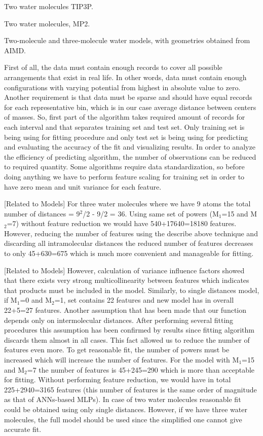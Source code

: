 \documentclass[aip,jcp,reprint,amsmath,amssymb,nature]{revtex4-1}
\begin{document}

Two water molecules TIP3P.

Two water molecules, MP2.

Two-molecule and three-molecule water models, with geometries obtained 
from AIMD.

First of all, the data must contain enough records to cover all possible arrangements that exist in real life. 
In other words, data must contain enough configurations with varying potential from highest in absolute value to zero. 
Another requirement is that data must be sparse and should have equal records for each representative bin, which is in our 
case average distance between centers of masses. 
So, first part of the algorithm takes required amount of records for each interval and that separates training set and test set. 
Only training set is being using for fitting procedure and only test set is being using for predicting and evaluating the accuracy of the fit and visualizing results. 
In order to analyze the efficiency of predicting algorithm, the number of observations can be reduced to required quantity. 
Some algorithms require data standardization, so before doing anything we have to perform feature scaling for training set in order to have zero mean and unit variance for each feature.

[Related to Models] For three water molecules where we have 9 atoms the total number of distances = 9$^{2}$/2 - 9/2 = 36. Using same set of powers (M$_{1}$=15 and M$_{2}$=7) without feature reduction we would have 540+17640=18180 features. However, reducing the number of features using the describe above technique and discarding all intramolecular distances the reduced number of features decreases to only 45+630=675 which is much more convenient and manageable for fitting.

[Related to Models] However, calculation of variance influence factors showed that there 
exists very strong multicollinearity between features which indicates 
that products must be included in the model. Similarly, to single 
distances model, if M$_{1}$=0 and M$_{2}$=1, set contains 22 
features and new model has in overall 22+5=27 features. Another 
assumption that has been made that our function depends only on 
intermolecular distances. After performing several fitting procedures 
this assumption has been confirmed by results since fitting algorithm 
discards them almost in all cases. This fact allowed us to reduce the 
number of features even more. To get reasonable fit, the number of 
powers must be increased which will increase the number of features. For 
the model with M$_{1}$=15 and M$_{2}$=7 the number of features 
is 45+245=290 which is more than acceptable for fitting. Without 
performing feature reduction, we would have in total 225+2940=3165 
features (this number of features is the same order of magnitude as that 
of ANNs-based MLPs). In case of two water molecules reasonable fit could 
be obtained using only single distances. However, if we have three water 
molecules, the full model should be used since the simplified one cannot 
give accurate fit. 
\end{document}

